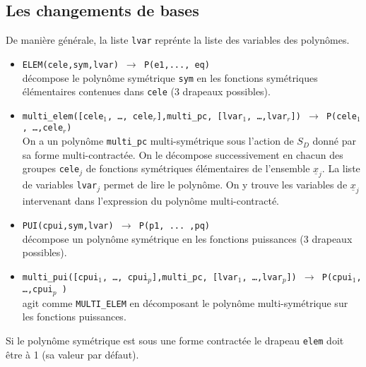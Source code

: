 \documentclass[11pt]{article}
\begin{document}
\subsection{Les changements de bases}
De mani\`ere g\'en\'erale, la liste {\tt lvar} repr\'ente la liste des
variables des polyn\^omes.
\begin{itemize}
\item {\tt ELEM(cele,sym,lvar) 
  $\longrightarrow$  P(e1,..., eq)}\\
 d\'{e}compose le polyn\^{o}me sym\'{e}trique {\tt sym} 
en les fonctions  sym\'{e}triques \'{e}l\'{e}mentaires
contenues dans {\tt cele} (3 drapeaux possibles).
\item {\tt multi\_elem([cele$_{1}$, \ldots, cele$_{r}$],multi\_pc,
[lvar$_{1}$, \ldots,lvar$_{r}$])  
$\longrightarrow$ 
 P(cele$_{1}$, \ldots ,cele$_{r}$)}\\
On a un polyn\^{o}me {\tt multi\_pc} multi-sym\'{e}trique sous l'action
de $S_D$ donn\'e par sa
forme multi-contract\'ee.
On le d\'ecompose
successivement en chacun des groupes {\tt cele$_{j}$} de
fonctions  sym\'{e}triques \'{e}l\'{e}mentaires de l'ensemble 
${\underline x}_j$. La liste
de variables {\tt lvar}$_j$ permet de lire le polyn\^ome. 
On y trouve les variables de ${\underline x}_j$ intervenant dans l'expression 
du polyn\^ome multi-contract\'e.

\item {\tt PUI(cpui,sym,lvar) 
$\longrightarrow$ P(p1, ... ,pq)}\\
 d\'{e}compose un polyn\^{o}me sym\'{e}trique en les 
fonctions
puissances (3 drapeaux possibles).
\item {\tt multi\_pui([cpui$_{1}$, \ldots, cpui$_{p}$],multi\_pc,
[lvar$_{1}$, \ldots,lvar$_{p}$]) 
 $\longrightarrow$ 
 P(cpui$_{1}$, \ldots ,cpui$_{p}$ )}\\
agit comme {\tt MULTI\_ELEM} en d\'ecomposant le polyn\^ome multi-sym\'etrique
sur les fonctions puissances.
\end{itemize}

Si le polyn\^{o}me sym\'{e}trique est sous une forme contract\'{e}e
le drapeau {\tt elem} doit \^{e}tre \`{a} 1 (sa valeur par d\'{e}faut).
\end{document}
